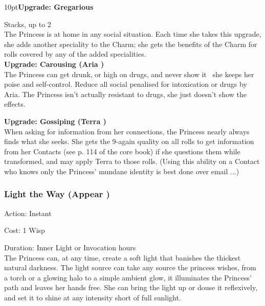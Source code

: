 \begin{myindentpar}{10pt}\noindent \textbf{Upgrade: Gregarious}

\noindent Stacks, up to 2 \\ 

\noindent The Princess is at home in any social situation. Each time she takes this upgrade, she adds another speciality to the Charm; she gets the benefits of the Charm for rolls covered by any of the added specialities.\\

\noindent \textbf{Upgrade: Carousing (Aria \textbullet\textbullet)}\\

\noindent The Princess can get drunk, or high on drugs, and never show it \textendash\, she keeps her poise and self-control. Reduce all social penalised for intoxication or drugs by Aria. The Princess isn't actually resistant to drugs, she just doesn’t show the effects.  

\noindent \textbf{Upgrade: Gossiping (Terra \textbullet\textbullet)}\\

\noindent When asking for information from her connections, the Princess nearly always finds what she seeks. She gets the 9-again quality on all rolls to get information from her Contacts (see p. 114 of the core book) if she questions them while transformed, and may apply Terra to those rolls. (Using this ability on a Contact who knows only the Princess' mundane identity is best done over email ...)\end{myindentpar}

\subsubsection*{Light the Way (Appear \textbullet)}

\noindent Action: Instant 

\noindent Cost: 1 Wisp 

\noindent Duration: Inner Light or Invocation hours \\

\noindent The Princess can, at any time, create a soft light that banishes the thickest natural darkness. The light source can take any source the princess wishes, from a torch or a glowing halo to a simple ambient glow, it illuminates the Princess' path and leaves her hands free. She can bring the light up or douse it reflexively, and set it to shine at any intensity short of full sunlight.

